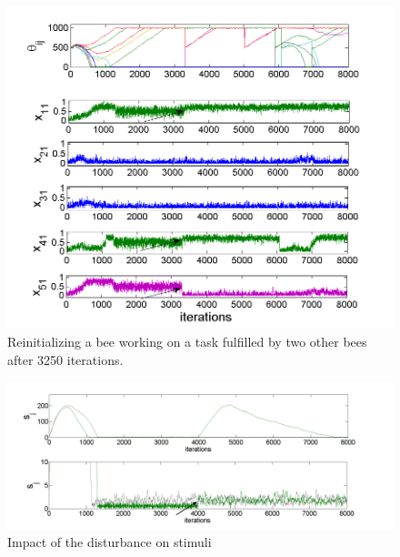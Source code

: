\begin{figure}[ht!]
\centering{}\includegraphics[scale=0.6]{figures/Figure2.png}\caption{Reinitializing a bee working on a task fulfilled by two other bees after 3250 iterations.}
\label{fig:figure2}
\end{figure}

\begin{figure}[ht!]
\centering{}\includegraphics[scale=0.35]{figures/Figure7.png}\caption{Impact of the disturbance on stimuli}
\label{fig:figure3}
\end{figure}



